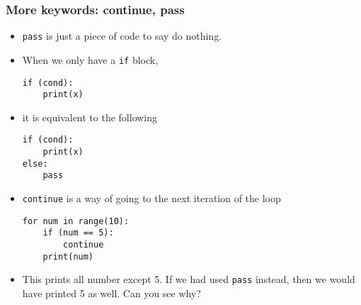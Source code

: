 \documentclass[presentation]{beamer}
\begin{document}
	\begin{frame}[fragile]
		\frametitle{More keywords: continue, pass}
		\begin{itemize}
			\item \lstinline|pass| is just a piece of code to say do nothing.
			\item When we only have a \lstinline|if| block, 
			\begin{lstlisting}[xleftmargin=\dimexpr-\leftmargini]
if (cond):
    print(x)
			\end{lstlisting}
			\item it is equivalent to the following
			
			\begin{lstlisting}[xleftmargin=\dimexpr-\leftmargini]
if (cond):
    print(x)
else:
    pass
			\end{lstlisting}
			\pause
			\item \lstinline|continue| is a way of going to the next iteration of the loop
			\begin{lstlisting}[xleftmargin=\dimexpr-\leftmargini]
for num in range(10):
    if (num == 5):
        continue
    print(num)
			\end{lstlisting}
    		\item This prints all number except 5. If we had used \lstinline|pass| instead, then we would have printed 5 as well. Can you see why?
		\end{itemize}
	\end{frame}
	
\end{document}
